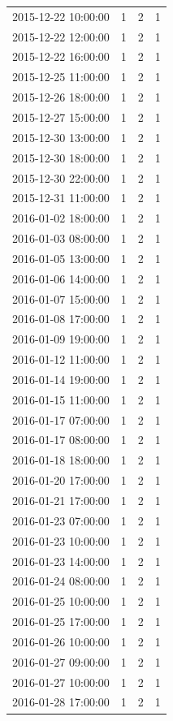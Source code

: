 \begin{tabular}{lrrr}
2015-12-22 10:00:00 & 1 & 2 & 1 \\
2015-12-22 12:00:00 & 1 & 2 & 1 \\
2015-12-22 16:00:00 & 1 & 2 & 1 \\
2015-12-25 11:00:00 & 1 & 2 & 1 \\
2015-12-26 18:00:00 & 1 & 2 & 1 \\
2015-12-27 15:00:00 & 1 & 2 & 1 \\
2015-12-30 13:00:00 & 1 & 2 & 1 \\
2015-12-30 18:00:00 & 1 & 2 & 1 \\
2015-12-30 22:00:00 & 1 & 2 & 1 \\
2015-12-31 11:00:00 & 1 & 2 & 1 \\
2016-01-02 18:00:00 & 1 & 2 & 1 \\
2016-01-03 08:00:00 & 1 & 2 & 1 \\
2016-01-05 13:00:00 & 1 & 2 & 1 \\
2016-01-06 14:00:00 & 1 & 2 & 1 \\
2016-01-07 15:00:00 & 1 & 2 & 1 \\
2016-01-08 17:00:00 & 1 & 2 & 1 \\
2016-01-09 19:00:00 & 1 & 2 & 1 \\
2016-01-12 11:00:00 & 1 & 2 & 1 \\
2016-01-14 19:00:00 & 1 & 2 & 1 \\
2016-01-15 11:00:00 & 1 & 2 & 1 \\
2016-01-17 07:00:00 & 1 & 2 & 1 \\
2016-01-17 08:00:00 & 1 & 2 & 1 \\
2016-01-18 18:00:00 & 1 & 2 & 1 \\
2016-01-20 17:00:00 & 1 & 2 & 1 \\
2016-01-21 17:00:00 & 1 & 2 & 1 \\
2016-01-23 07:00:00 & 1 & 2 & 1 \\
2016-01-23 10:00:00 & 1 & 2 & 1 \\
2016-01-23 14:00:00 & 1 & 2 & 1 \\
2016-01-24 08:00:00 & 1 & 2 & 1 \\
2016-01-25 10:00:00 & 1 & 2 & 1 \\
2016-01-25 17:00:00 & 1 & 2 & 1 \\
2016-01-26 10:00:00 & 1 & 2 & 1 \\
2016-01-27 09:00:00 & 1 & 2 & 1 \\
2016-01-27 10:00:00 & 1 & 2 & 1 \\
2016-01-28 17:00:00 & 1 & 2 & 1 \\

\end{tabular}
